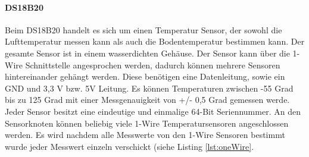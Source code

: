 \paragraph{DS18B20} Beim DS18B20 handelt es sich um einen Temperatur Sensor, der sowohl die Lufttemperatur messen kann als auch die Bodentemperatur bestimmen kann. Der gesamte Sensor ist in einem wasserdichten Gehäuse. Der Sensor kann über die 1-Wire Schnittstelle angesprochen werden, dadurch können mehrere Sensoren hintereinander gehängt werden. Diese benötigen eine Datenleitung, sowie ein GND und 3,3 V bzw. 5V Leitung. Es können Temperaturen zwischen  -55 Grad bis zu 125 Grad mit einer Messgenauigkeit von +/- 0,5 Grad gemessen werde. Jeder Sensor besitzt  eine eindeutige und einmalige 64-Bit Seriennummer. An den Sensorknoten können beliebig viele 1-Wire Temperatursensoren angeschlossen werden. Es wird nachdem alle Messwerte von den 1-Wire Sensoren bestimmt wurde jeder Messwert einzeln verschickt (siehe Listing \ref{lst:oneWire}.


